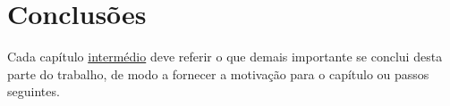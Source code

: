 \begin{comment}
[1]: _K. Sato, K. Higuchi, H. Katsuma, Holographic television by liquid crystal device, in: Third International Conference on Holographic Systems, Components and Applications, 1991, IET, 1991, pp. 20–23._ \
[2]: _H. Yoshikawa, Digital holographic signal processing, in: Proceeding of the TAO First International Symposium, 1993, pp. S–4–2._\
[3]: _H. Yoshikawa, J. Tamai, Holographic image compression by motion picture coding, in: Proceedings of SPIE, 2652, 1996, p. 2._\
[4]: _J. Naughton, Y. Frauel, B. Javidi, E. Tajahuerce, Compression of digital holograms for three-dimensional object reconstruction and recognition, Appl. Opt. 41 (20) (2002)4124–4132._\
[5]: _G.A. Mills, I. Yamaguchi, Effects of quantization in phase-shifting digital holography, Appl. Opt. 44 (7) (2005) 1216–1225._\
[6]: _E. Darakis, J.J. Soraghan, Reconstruction domain compression of phase-shifting digital holograms, Appl. Opt. 46 (3) (2007) 351–356._\
[7]: _Y. Seo, H. Choi, J. Bae, J. Yoo, D. Kim, Data compression technique for digital holograms using a temporally scalable coding method for 2-D images, in: IEEE International Symposium on Signal Processing and Information Technology, 2006, pp. 326–331._\
[8]: _M. Liebling, T. Blu, M. Unser, Fresnelets: new multiresolution wavelet bases for digital holography, IEEE Trans. Image Process.: Publ. IEEE Signal Process. Soc. 12 (1) (2003) 29–43._\
[9]: _J. Peixeiro, C. Brites, J. Ascenso, F. Pereira, Digital holography: Benchmarking coding standards and representation formats, in: IEEE International Conf. on Multimedia and Expo - ICME, 2016_\
[10]: _F. Dufaux, Y. Xing, B. Pesquet-Popescu, P. Schelkens, Compression of digital holographic data: an overview, Proc. SPIE 9599 (2015) 95990I–95990I–11._ \
[11]: _] Y. Xing, M. Kaaniche, B. Pesquet-Popescu, F. Dufaux (Eds.), Digital Holographic Data Representation and Compression, Academic Press, 2016._ \
\end{comment}



\section{Conclusões}
\label{chap2:sec:concs}
Cada capítulo \underline{intermédio} deve referir o que demais importante se conclui desta parte do trabalho, de modo a fornecer a motivação para o capítulo ou passos seguintes.